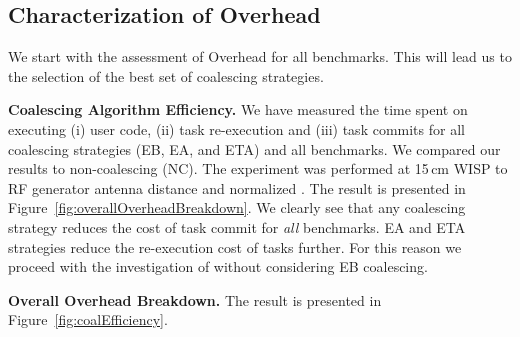 
\subsection{Characterization of \sys Overhead}
\label{sec:coala_overhead}

We start with the assessment of \sys Overhead for all benchmarks. This will lead us to the selection of the best set of coalescing strategies.

\indent \textbf{\sys Coalescing Algorithm Efficiency.} We have measured the time spent on executing (i) user code, (ii) task re-execution and (iii) task commits for all coalescing strategies (EB, EA, and ETA) and all benchmarks. We compared our results to non-coalescing \sys (NC). The experiment was performed at 15\,cm WISP to RF generator antenna distance and normalized . The result is presented in Figure~\ref{fig:overallOverheadBreakdown}. We clearly see that any \sys coalescing strategy reduces the cost of task commit for \emph{all} benchmarks. EA and ETA strategies reduce the re-execution cost of tasks further. For this reason we proceed with the investigation of \sys without considering EB coalescing.

\textbf{Overall \sys Overhead Breakdown.} The result is presented in Figure~\ref{fig:coalEfficiency}.

